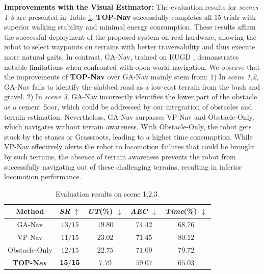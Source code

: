 \documentclass[conference]{IEEEtran}
\begin{document}
\noindent\textbf{Improvements with the Visual Estimator:}
The evaluation results for \textit{scenes 1-3} are presented in Table \ref{Real World123}. \textbf{TOP-Nav} successfully completes all 15 trials with superior walking stability and minimal energy consumption. These results affirm the successful deployment of the proposed system on real hardware, allowing the robot to select waypoints on terrains with better traversability and thus execute more natural gaits. In contrast, GA-Nav, trained on RUGD \cite{wigness2019rugd}, demonstrates notable limitations when confronted with open-world navigation. We observe that the improvements of \textbf{TOP-Nav} over GA-Nav mainly stem from: 1) In \textit{scene 1,2}, GA-Nav fails to identify the slabbed road as a low-cost terrain from the bush and gravel. 2) In \textit{scene 3}, GA-Nav incorrectly identifies the lower part of the obstacle as a cement floor, which could be addressed by our integration of obstacles and terrain estimation. Nevertheless, GA-Nav surpasses VP-Nav and Obstacle-Only, which navigates without terrain awareness. With Obstacle-Only, the robot gets stuck by the stones or Grassroots, leading to a higher time consumption. While VP-Nav effectively alerts the robot to locomotion failures that could be brought by such terrains, the absence of terrain awareness prevents the robot from successfully navigating out of these challenging terrains, resulting in inferior locomotion performance.
\begin{table}[t]
\small
\renewcommand{\arraystretch}{1.3}
\caption{Evaluation results on scene 1,2,3.}
\begin{center}
\begin{tabular}{c|c c c c} 
\hline
\textbf{Method}&{\textit{SR}} $\uparrow$ &{\textit{UT}(\%)} $\downarrow$ &{\textit{AEC}} $\downarrow$ & {\textit{Time}(\%)} $\downarrow$ \\
\hline
GA-Nav& ${13/15}$& ${19.80}$& ${74.42}$& ${68.76}$\\
VP-Nav            & ${11/15}$& ${23.02}$& ${71.45}$& ${80.12}$\\
Obstacle-Only& ${12/15}$& ${22.75}$& ${71.09}$& ${79.72}$\\
\textbf{TOP-Nav}  & ${\bf{15/15}}$& ${\bm{7.79}}$& ${\bm{59.07}}$& 
${\bm{65.03}} $\\
\hline
\end{tabular}
\label{Real World123}
\end{center}
\end{table}
\end{document}
